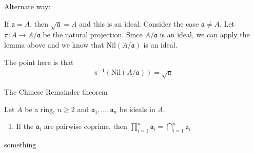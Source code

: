 \documentclass{book}
\theoremstyle{custom_definition}
\theoremstyle{custom_theorem}
\begin{document}
    Alternate way:

    If \(\mathfrak{a} = A\), then \(\sqrt{\mathfrak{a}} = A\) and this is an ideal. Consider the case \(\mathfrak{a} \neq A\). Let \(\pi: A \longrightarrow A / \mathfrak{a}\) be the natural projection. Since \(A / \mathfrak{a}\) is an ideal, we can apply the lemma above and we know that \(\text{Nil}(A / \mathfrak{a})\) is an ideal.

    The point here is that
    \begin{align}
        \pi^{-1} (\text{Nil}(A / \mathfrak{a})) = \sqrt{\mathfrak{a}}
    \end{align}


    The Chinese Remainder theorem

    Let \(A\) be a ring, \(n \geq 2\) and \(\mathfrak{a}_1, \ldots, \mathfrak{a}_n\) be ideals in \(A\).
    \begin{enumerate}
        \item If the \(\mathfrak{a}_i\) are pairwise coprime, then \(\prod_{i=1}^n \mathfrak{a}_i = \bigcap_{i=1}^n \mathfrak{a}_i\)
    \end{enumerate}
    something
\end{document}
